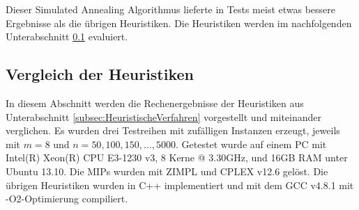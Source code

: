 \documentclass{scrreprt}
\begin{document}
Dieser Simulated Annealing Algorithmus lieferte in Tests meist etwas bessere Ergebnisse als die übrigen Heuristiken.
Die Heuristiken werden im nachfolgenden Unterabschnitt \ref{subsec:VergleichDerHeuristiken} evaluiert.


\subsection{Vergleich der Heuristiken}
\label{subsec:VergleichDerHeuristiken}
In diesem Abschnitt werden die Rechenergebnisse der Heuristiken aus Unterabschnitt \ref{subsec:HeuristischeVerfahren} vorgestellt und miteinander verglichen.
Es wurden drei Testreihen mit zufälligen Instanzen erzeugt, jeweils mit $m=8$ und $n=50,100,150,\ldots,5000$.
Getestet wurde auf einem PC mit Intel(R) Xeon(R) CPU E3-1230 v3, 8 Kerne @ 3.30GHz, und 16GB RAM unter Ubuntu 13.10.
Die MIPs wurden mit ZIMPL \cite{Koch2004} und CPLEX v12.6 gelöst.
Die übrigen Heuristiken wurden in C++ implementiert und mit dem GCC v4.8.1 mit -O2-Optimierung compiliert.
\end{document}
